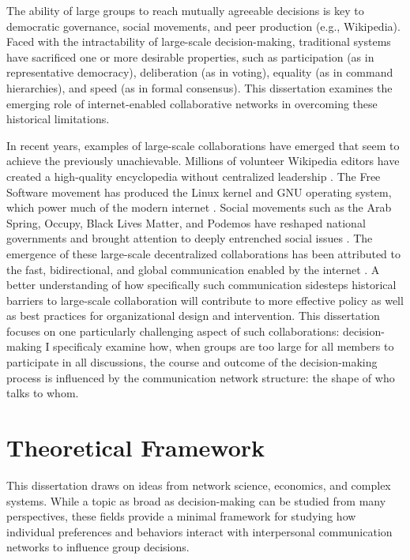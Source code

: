 The ability of large groups to reach mutually agreeable decisions is key to
democratic governance, social movements, and peer production (e.g., Wikipedia).
Faced with the intractability of large-scale decision-making, traditional
systems have sacrificed one or more desirable properties, such as participation
(as in representative democracy), deliberation (as in voting), equality
(as in command hierarchies), and speed (as in formal consensus).
This dissertation examines the emerging role of internet-enabled collaborative
networks in overcoming these historical limitations.

In recent years, examples of large-scale collaborations have emerged that seem
to achieve the previously unachievable. Millions of volunteer Wikipedia editors
have created a high-quality encyclopedia without centralized leadership
\cite{keegan_evolution_2017, giles_internet_2005}.
The Free Software movement has produced the Linux kernel and GNU operating
system, which power much of the modern internet
\cite{coleman_coding_2013, benkler_coases_2002, raymond_cathedral_1999}.
Social movements such as the Arab Spring, Occupy, Black Lives Matter, and
Podemos have reshaped national governments and brought attention to deeply
entrenched social issues
\cite{tufekci_twitter_2017, gonzalez-bailon_networked_2016}.
The emergence of these large-scale decentralized collaborations has been
attributed to the fast, bidirectional,
and global communication enabled by the internet
\cite{tufekci_twitter_2017, benkler_coases_2002}.
A better understanding of how specifically such communication sidesteps
historical barriers to large-scale collaboration will contribute to more
effective policy as well as best practices for organizational design and
intervention.
This dissertation focuses on one particularly challenging aspect of
such collaborations: decision-making
I specificaly examine how,
when groups are too large for all members to participate in all discussions,
the course and outcome of the decision-making process is influenced by the
communication network structure: the shape of who talks to whom.

\section{Theoretical Framework}

This dissertation draws on ideas from network science, economics, and complex
systems.
While a topic as broad as decision-making can be studied from many perspectives,
these fields provide a minimal framework for studying how individual preferences
and behaviors interact with interpersonal communication networks to influence
group decisions.

